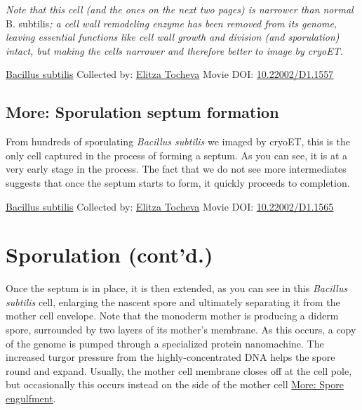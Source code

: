 \documentclass[]{tufte-book}
\begin{document}
\emph{Note that this cell (and the ones on the next two pages) is narrower than normal }B. subtilis\emph{; a cell wall remodeling enzyme has been removed from its genome, leaving essential functions like cell wall growth and division (and sporulation) intact, but making the cells narrower and therefore better to image by cryoET.}



\hypertarget{htmlwidget-2937fb987d6b5fa49ebe}{}

\label{fig:8-5}\protect\hyperlink{tree}{Bacillus subtilis} Collected by: \protect\hyperlink{elitza_tocheva}{Elitza Tocheva} Movie DOI: \href{https://doi.org/10.22002/D1.1557}{10.22002/D1.1557}

\hypertarget{Sporulation_septum_formation}{%
\subsection*{More: Sporulation septum formation}\label{Sporulation_septum_formation}}

From hundreds of sporulating \emph{Bacillus subtilis} we imaged by cryoET, this is the only cell captured in the process of forming a septum. As you can see, it is at a very early stage in the process. The fact that we do not see more intermediates suggests that once the septum starts to form, it quickly proceeds to completion.



\hypertarget{htmlwidget-385dd41452d2a24651ef}{}

\label{fig:8-5a}\protect\hyperlink{tree}{Bacillus subtilis} Collected by: \protect\hyperlink{elitza_tocheva}{Elitza Tocheva} Movie DOI: \href{https://doi.org/10.22002/D1.1565}{10.22002/D1.1565}

\hypertarget{sporulation-contd.}{%
\section{Sporulation (cont'd.)}\label{sporulation-contd.}}

Once the septum is in place, it is then extended, as you can see in this \emph{Bacillus subtilis} cell, enlarging the nascent spore and ultimately separating it from the mother cell envelope. Note that the monoderm mother is producing a diderm spore, surrounded by two layers of its mother's membrane. As this occurs, a copy of the genome is pumped through a specialized protein nanomachine. The increased turgor pressure from the highly-concentrated DNA helps the spore round and expand. Usually, the mother cell membrane closes off at the cell pole, but occasionally this occurs instead on the side of the mother cell \protect\hyperlink{Spore_engulfment}{More: Spore engulfment}.
\end{document}
